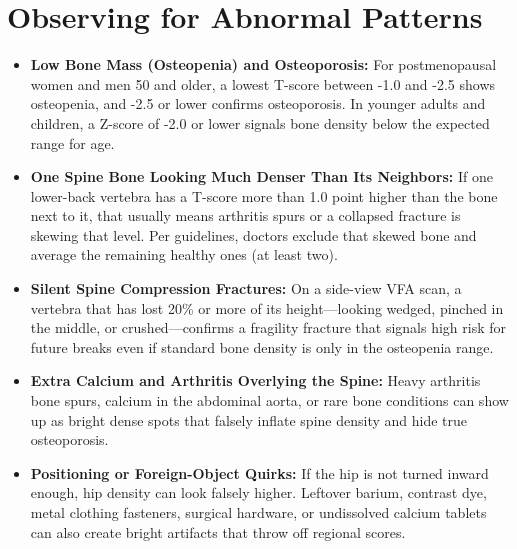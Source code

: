 \section{Observing for Abnormal Patterns}
\begin{itemize}
\item \textbf{Low Bone Mass (Osteopenia) and Osteoporosis:} For postmenopausal women and men 50 and older, a lowest T-score between -1.0 and -2.5 shows osteopenia, and -2.5 or lower confirms osteoporosis. In younger adults and children, a Z-score of -2.0 or lower signals bone density below the expected range for age.
\item \textbf{One Spine Bone Looking Much Denser Than Its Neighbors:} If one lower-back vertebra has a T-score more than 1.0 point higher than the bone next to it, that usually means arthritis spurs or a collapsed fracture is skewing that level. Per guidelines, doctors exclude that skewed bone and average the remaining healthy ones (at least two).
\item \textbf{Silent Spine Compression Fractures:} On a side-view VFA scan, a vertebra that has lost 20\% or more of its height---looking wedged, pinched in the middle, or crushed---confirms a fragility fracture that signals high risk for future breaks even if standard bone density is only in the osteopenia range.
\item \textbf{Extra Calcium and Arthritis Overlying the Spine:} Heavy arthritis bone spurs, calcium in the abdominal aorta, or rare bone conditions can show up as bright dense spots that falsely inflate spine density and hide true osteoporosis.
\item \textbf{Positioning or Foreign-Object Quirks:} If the hip is not turned inward enough, hip density can look falsely higher. Leftover barium, contrast dye, metal clothing fasteners, surgical hardware, or undissolved calcium tablets can also create bright artifacts that throw off regional scores.
\end{itemize}

